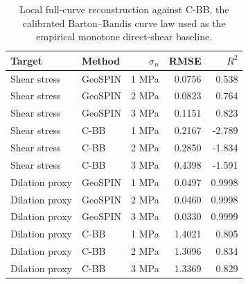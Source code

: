 \begin{table}[t]
\centering
\caption{Local full-curve reconstruction against C-BB, the calibrated Barton--Bandis curve law used as the empirical monotone direct-shear baseline.}
\label{tab:curve_metrics}
\begin{tabular}{llrrr}
\toprule
Target & Method & $\sigma_n$ & RMSE & $R^2$ \\
\midrule
Shear stress & GeoSPIN & 1 MPa & 0.0756 & 0.538 \\
Shear stress & GeoSPIN & 2 MPa & 0.0823 & 0.764 \\
Shear stress & GeoSPIN & 3 MPa & 0.1151 & 0.823 \\
Shear stress & C-BB & 1 MPa & 0.2167 & -2.789 \\
Shear stress & C-BB & 2 MPa & 0.2850 & -1.834 \\
Shear stress & C-BB & 3 MPa & 0.4398 & -1.591 \\
\midrule
Dilation proxy & GeoSPIN & 1 MPa & 0.0497 & 0.9998 \\
Dilation proxy & GeoSPIN & 2 MPa & 0.0460 & 0.9998 \\
Dilation proxy & GeoSPIN & 3 MPa & 0.0330 & 0.9999 \\
Dilation proxy & C-BB & 1 MPa & 1.4021 & 0.805 \\
Dilation proxy & C-BB & 2 MPa & 1.3096 & 0.834 \\
Dilation proxy & C-BB & 3 MPa & 1.3369 & 0.829 \\
\bottomrule
\end{tabular}
\end{table}
